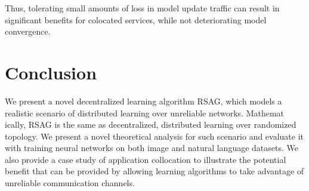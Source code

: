 \documentclass{article}
\newcounter{thm_counter}
\begin{document}
Thus, tolerating small amounts of loss in model update traffic can result in significant benefits for colocated services, while not deteriorating model convergence.

\section{Conclusion}

We present a novel decentralized learning algorithm
RSAG, which models a realistic scenario of distributed learning
over unreliable networks. Mathemat
ically, RSAG is the same
as decentralized, distributed learning over randomized topology.
We present a novel theoretical analysis for such scenario and
evaluate it with training neural networks on both image and natural language datasets. We also provide a case study of application 
collocation to illustrate the potential benefit that can be provided
by allowing learning algorithms to take advantage of 
unreliable communication channels.


\end{document}

